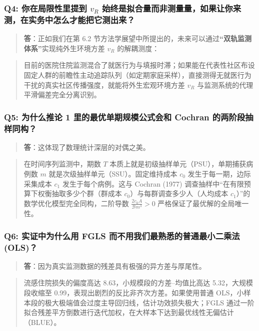 \documentclass[11pt,a4paper]{ctexart}
\begin{document}
\subsubsection{Q4: 你在局限性里提到 $v_R$ 始终是拟合量而非测量量，如果让你来测，在实务中怎么才能把它测出来？}
\begin{quote}\small\color{black!75}
\textbf{答}：正如我们在第 6.2 节方法学展望中所提出的，未来可以通过\textbf{“双轨监测体系”}实现纯外生环境方差 $v_R$ 的解耦测度：
\end{quote}
\begin{quote}\small\color{black!75}
目前的医院住院监测混合了就医行为与填报时滞；如果能在代表性社区布设固定人群的前瞻性主动追踪队列（如定期家庭采样），直接测得无就医行为干扰的真实社区传播强度，就能将外生宏观环境方差 $v_R$ 与监测系统的代理平滑偏差完全分离识别。
\end{quote}

\subsubsection{Q5: 为什么推论 1 里的最优单期规模公式会和 Cochran 的两阶段抽样同构？}
\begin{quote}\small\color{black!75}
\textbf{答}：这体现了数理统计深层的对偶之美。
\end{quote}
\begin{quote}\small\color{black!75}
在时间序列监测中，期数 $T$ 本质上就是初级抽样单元（PSU），单期捕获病例数 $m$ 就是次级抽样单元（SSU）。固定维持成本 $c_0$ 发生于每一期，边际采集成本 $c_1$ 发生于每个病例。这与 Cochran (1977) 调查抽样中“在有限预算下权衡抽取多少个群（群成本 $c_0$）与每群调查多少人（人均成本 $c_1$）”的数学优化模型完全同构，二阶导数 $\frac{2c_0 A}{\mathcal{B} m^3} > 0$ 严格保证了最优解的全局唯一性。
\end{quote}

\subsubsection{Q6: 实证中为什么用 FGLS 而不用我们最熟悉的普通最小二乘法 (OLS)？}
\begin{quote}\small\color{black!75}
\textbf{答}：因为真实监测数据的残差具有极强的异方差与厚尾性。
\end{quote}
\begin{quote}\small\color{black!75}
流感住院损失的偏度高达 8.63，小规模段的方差--均值比高达 5.32，大规模段收缩至 0.99，表现出剧烈的反比非齐次方差。如果使用普通 OLS，小样本段的极大极端值会过度主导回归线，估计功效损失极大；FGLS 通过一阶拟合残差平方倒数进行迭代加权，在大样本下达到最优线性无偏估计（BLUE）。
\end{quote}
\end{document}
